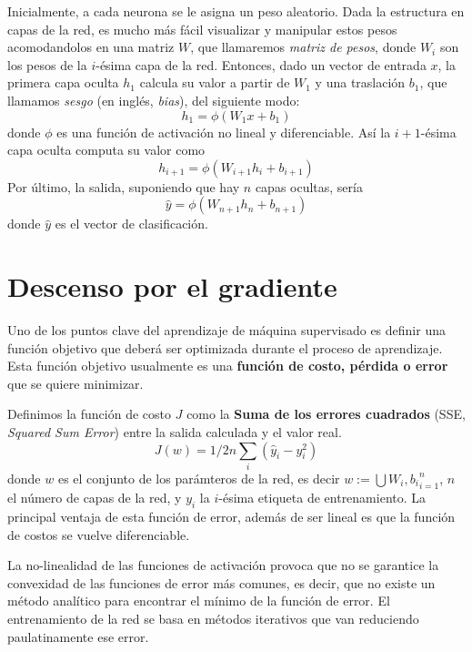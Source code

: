 Inicialmente, a cada neurona se le asigna un peso aleatorio. Dada la
estructura en capas de la red, es mucho más fácil visualizar y
manipular estos pesos acomodandolos en una matriz $W$, que llamaremos
\textit{matriz de pesos}, donde $W_i$ son los pesos de la $i$-ésima
capa de la red. Entonces, dado un vector de entrada $x$, la primera
capa oculta $h_1$ calcula su valor a partir de $W_1$ y una traslación
$b_1$, que llamamos \textit{sesgo} (en inglés, \textit{bias}), del
siguiente modo:
\begin{equation}
  h_1 = \phi(W_1x + b_1)
\end{equation}
donde $\phi$ es una función de activación no lineal y
diferenciable. Así la $i+1$-ésima capa oculta computa su valor como
\begin{equation}
  h_{i+1} = \phi(W_{i+1}h_i + b_{i+1})
\end{equation}
Por último, la salida, suponiendo que hay $n$ capas ocultas, sería
\begin{equation}
  \hat{y} = \phi{(W_{n+1}h_n + b_{n+1})}
\end{equation}
donde $\hat{y}$ es el vector de clasificación.

\section{Descenso por el gradiente}
Uno de los puntos clave del aprendizaje de máquina supervisado es
definir una función objetivo que deberá ser optimizada durante el
proceso de aprendizaje. Esta función objetivo usualmente es una
\textbf{función de costo, pérdida o error} que se quiere minimizar.

Definimos la función de costo $J$ como la \textbf{Suma de los errores
  cuadrados} (SSE, \textit{Squared Sum Error}) entre la salida
  calculada y el valor real.
\begin{equation}
  J(w)=1/2n \sum_i (\hat{y}_i - y_i^2)
\end{equation}
donde $w$ es el conjunto de los parámteros de la red, es decir $w :=
\bigcup{W_i, b_i}_{i=1}^{n}$, $n$ el número de capas de la red, y
$y_i$ la $i$-ésima etiqueta de entrenamiento. La principal ventaja de
esta función de error, además de ser lineal es que la función de
costos se vuelve diferenciable.

La no-linealidad de las funciones de activación provoca que no se
garantice la convexidad de las funciones de error más comunes, es
decir, que no existe un método analítico para encontrar el mínimo de
la función de error. El entrenamiento de la red se basa en métodos
iterativos que van reduciendo paulatinamente ese error.

